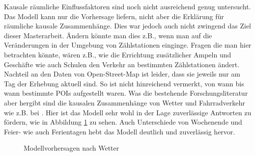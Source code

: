 \documentclass[a4paper,12pt]{thesis}
\begin{document}
Kausale räumliche Einflussfaktoren sind noch nicht ausreichend genug untersucht. Das Modell kann nur die Vorhersage liefern, nicht aber die Erklärung für räumliche kausale Zusammenhänge. Dies war jedoch auch nicht zwingend das Ziel dieser Masterarbeit. Ändern könnte man dies z.B., wenn man auf die Veränderungen in der Umgebung von Zählstationen einginge. Fragen die man hier betrachten könnte, wären z.B., wie die Errichtung zusätzlicher Ampeln und Geschäfte wie auch Schulen den Verkehr an bestimmten Zählstationen ändert. Nachteil an den Daten von Open-Street-Map ist leider, dass sie jeweils nur am Tag der Erhebung aktuell sind. So ist nicht hinreichend vermerkt, von wann bis wann bestimmte POIs aufgestellt waren. Was die bestehende Forschungsliteratur aber hergibt sind die kausalen Zusammenhänge von Wetter und Fahrradverkehr wie z.B. bei \cite{Wessel2020}. Hier ist das Modell sehr wohl in der Lage zuverlässige Antworten zu fördern, wie in Abbildung \ref{fig:Temperaturunterschied} zu sehen. Auch Unterschiede von Wochenende und Feier- wie auch Ferientagen hebt das Modell deutlich und zuverlässig hervor.

\begin{figure}%
	\centering
	
	\caption{Modellvorhersagen nach Wetter}%
	\label{fig:Temperaturunterschied}%
\end{figure}
\end{document}

